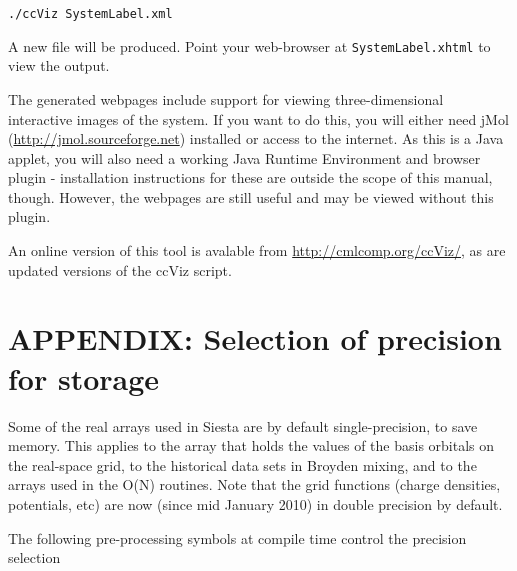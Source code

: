 \texttt{./ccViz SystemLabel.xml}

A new file will be produced. Point your web-browser at \texttt{SystemLabel.xhtml}
to view the output.

The generated webpages include support for viewing three-dimensional
interactive images of the system. If you want to do this, you will
either need jMol (\url{http://jmol.sourceforge.net}) installed or access
to the internet. As this
is a Java applet, you will also need a working Java Runtime
Environment and browser plugin - installation instructions for these
are outside the scope of this manual, though. However, the webpages
are still useful and may be viewed without this plugin.

An online version of this tool is avalable from
\url{http://cmlcomp.org/ccViz/}, as are updated versions of
the ccViz script.

\newpage
\section{APPENDIX: Selection of precision for storage}

Some of the real arrays used in Siesta are by default
single-precision, to save memory. This applies to the array that holds
the values of the basis orbitals on the real-space grid, to the
historical data sets in Broyden mixing, and to the arrays used in the
O(N) routines. Note that the grid functions (charge densities,
potentials, etc) are now (since mid January 2010) in double
precision by default.

The following pre-processing symbols at compile time control the 
precision selection

